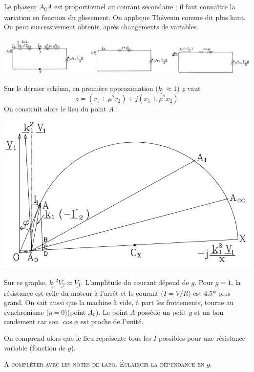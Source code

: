 		Le phaseur $\underline{A_0A}$ est proportionnel au courant secondaire : il faut connaître 
		la variation en fonction du glissement. On applique Thévenin comme dit plus haut. On 
		peut successivement obtenir, après changements de variables 
		\begin{center}
		\includegraphics[scale=0.35]{ch5/image29.png}
		\end{center}
		Sur le dernier schéma, en première approximation ($\underline{k_1}\approx 1$) 
		$\underline{z}$ vaut
		\begin{equation}
		\underline{z} = (r_1+\mu^2r_2) + j(x_1+\mu^2x_2)
		\end{equation}
		On construit alors le lieu	du point $A$ : 
		\begin{center}
		\includegraphics[scale=0.5]{ch5/image30.png}
		\end{center}
		Sur ce graphe, $\underline{k_1}^2\underline{V_2}\approx\underline{V_1}$. L'amplitude 
		du courant dépend de $g$. Pour $g=1$, la résistance est celle du moteur à l'arrêt et 
		le courant ($I =V/R$) est 4.5* plus grand. On sait aussi que la machine à vide, à 
		part les frottements, tourne au synchronisme ($g=0$)(point $A_0$). Le point $A$ possède 
		un petit $g$ et un bon rendement car son $\cos\phi$ est proche de l'unité.
		
		On comprend alors que le lieu représente tous les $I$ possibles pour une résistance 
		variable (fonction de $g$).

		\textsc{A compléter avec les notes de labo. Éclaircir la dépendance en $g$.}
		
